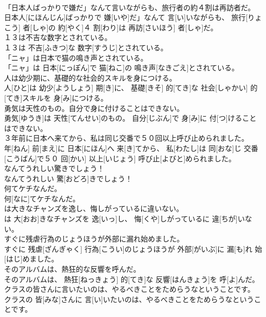 \documentclass[8pt]{extreport}
\begin{document}
\begin{CJK}{UTF8}{min}
\\	「日本人ばっかりで嫌だ」なんて言いながらも、旅行者の約４割は再訪者だ。	
\\	日本人[にほんじん]ばっかりで 嫌[いや]だ」なんて 言[い]いながらも、 旅行[りょこう] 者[しゃ]の 約[やく]４ 割[わり]は 再訪[さいほう] 者[しゃ]だ。	
\\	１３は不吉な数字とされている。	
\\	１３は 不吉[ふきつ]な 数字[すうじ]とされている。	
\\	「ニャ」は日本で猫の鳴き声とされている。	
\\	「ニャ」は 日本[にっぽん]で 猫[ねこ]の 鳴き声[なきごえ]とされている。	
\\	人は幼少期に、基礎的な社会的スキルを身につける。	
\\	人[ひと]は 幼少[ようしょう] 期[き]に、 基礎[きそ] 的[てき]な 社会[しゃかい] 的[てき]スキルを 身[み]につける。	
\\	勇気は天性のもの。自分で身に付けることはできない。	
\\	勇気[ゆうき]は 天性[てんせい]のもの。 自分[じぶん]で 身[み]に 付[つ]けることはできない。	
\\	３年前に日本へ来てから、私は同じ交番で５０回以上呼び止められました。	
\\	年[ねん] 前[まえ]に 日本[にほん]へ 来[き]てから、 私[わたし]は 同[おな]じ 交番[こうばん]で５０ 回[かい] 以上[いじょう] 呼び止[よびと]められました。	
\\	なんてうれしい驚きでしょう！	
\\	なんてうれしい 驚[おどろ]きでしょう！	
\\	何てケチなんだ。	
\\	何[なに]てケチなんだ。	
\\	は大きなチャンズを逸し、悔しがっているに違いない。	
\\	は 大[おお]きなチャンズを 逸[いっ]し、 悔[くや]しがっているに 違[ちが]いない。	
\\	すぐに残虐行為のじょうほうが外部に漏れ始めました。	
\\	すぐに 残虐[ざんぎゃく] 行為[こうい]のじょうほうが 外部[がいぶ]に 漏[も]れ 始[はじ]めました。	
\\	そのアルバムは、熱狂的な反響を呼んだ。	
\\	そのアルバムは、 熱狂[ねっきょう] 的[てき]な 反響[はんきょう]を 呼[よ]んだ。	
\\	クラスの皆さんに言いたいのは、やるべきことをためらうなということです。	
\\	クラスの 皆[みな]さんに 言[い]いたいのは、やるべきことをためらうなということです。	

\end{CJK}
\end{document}
